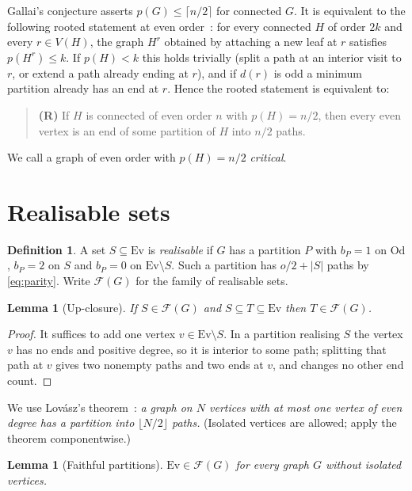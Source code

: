 \documentclass[11pt]{amsart}
\newtheorem{lemma}[theorem]{Lemma}
\theoremstyle{definition}
\newtheorem{definition}[theorem]{Definition}
\newcommand{\cF}{\mathcal F}
\newcommand{\Ev}{\mathrm{Ev}}
\newcommand{\Od}{\mathrm{Od}}
\begin{document}
Gallai's conjecture asserts $p(G)\le\lceil n/2\rceil$ for connected $G$. It is equivalent to the
following rooted statement at even order~\cite{REC,SP}: for every connected $H$ of order $2k$ and
every $r\in V(H)$, the graph $H^r$ obtained by attaching a new leaf at $r$ satisfies $p(H^r)\le k$.
If $p(H)<k$ this holds trivially (split a path at an interior visit to $r$, or extend a path already
ending at $r$), and if $d(r)$ is odd a minimum partition already has an end at $r$. Hence the rooted
statement is equivalent to:

\begin{quote}
\textbf{(R)} If $H$ is connected of even order $n$ with $p(H)=n/2$, then every even vertex is an end
of some partition of $H$ into $n/2$ paths.
\end{quote}
We call a graph of even order with $p(H)=n/2$ \emph{critical}.

\section{Realisable sets}

\begin{definition}
A set $S\subseteq\Ev$ is \emph{realisable} if $G$ has a partition $P$ with $b_P=1$ on $\Od$, $b_P=2$
on $S$ and $b_P=0$ on $\Ev\setminus S$. Such a partition has $o/2+|S|$ paths by \eqref{eq:parity}.
Write $\cF(G)$ for the family of realisable sets.
\end{definition}

\begin{lemma}[Up-closure]\label{lem:up}
If $S\in\cF(G)$ and $S\subseteq T\subseteq \Ev$ then $T\in\cF(G)$.
\end{lemma}

\begin{proof}
It suffices to add one vertex $v\in\Ev\setminus S$. In a partition realising $S$ the vertex $v$ has no
ends and positive degree, so it is interior to some path; splitting that path at $v$ gives two
nonempty paths and two ends at $v$, and changes no other end count.
\end{proof}

We use Lov\'asz's theorem~\cite{L68}: \emph{a graph on $N$ vertices with at most one vertex of even
degree has a partition into $\lfloor N/2\rfloor$ paths.} (Isolated vertices are allowed; apply the
theorem componentwise.)

\begin{lemma}[Faithful partitions]\label{lem:faithful}
$\Ev\in\cF(G)$ for every graph $G$ without isolated vertices.
\end{lemma}
\end{document}
